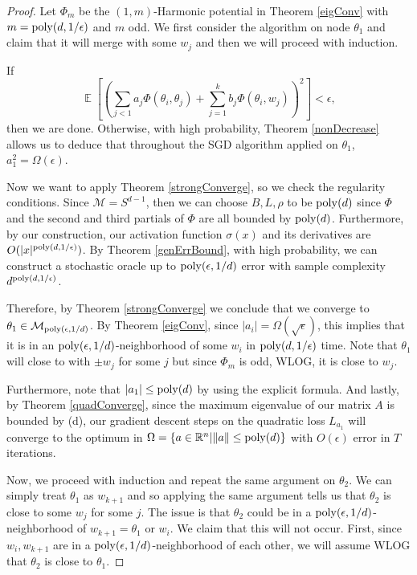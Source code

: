 \documentclass[11pt]{article}
\newcommand{\R}{{\mathbb{R}}}
\DeclareMathOperator*{\expt}{\mathbb{E}}
\begin{document}
\begin{proof}
Let $\Phi_m$ be the $(1,m)$-Harmonic potential in Theorem \ref{eigConv} with $m = \mathrm{poly}(d,1/\epsilon)$ and $m$ odd. We first consider the algorithm on node $\theta_1$ and claim that it will merge with some $w_j$ and then we will proceed with induction. 


If
%
\[ \expt\left[\left( \sum_{j < 1} a_j \Phi(\theta_i,\theta_j) +
    \sum_{j=1}^k b_j \Phi(\theta_i,w_j)\right)^2\right] < \epsilon,\]
then we are done. Otherwise, with high probability, Theorem
\ref{nonDecrease} allows us to deduce that throughout the SGD
algorithm applied on $\theta_1$, $a_1^2 = \Omega(\epsilon)$.

Now we want to apply Theorem \ref{strongConverge}, so we check the regularity conditions. Since $\mathcal{M} = S^{d-1}$, then we can choose $B, L, \rho$ to be $\mathrm{poly}(d)$ since $\Phi$ and the second and third partials of $\Phi$ are all bounded by $\mathrm{poly}(d)$. Furthermore, by our construction, our activation function $\sigma(x)$ and its derivatives are $O(|x|^{\mathrm{poly}(d,1/\epsilon)})$. By Theorem \ref{genErrBound}, with high probability, we can construct a stochastic oracle up to $\mathrm{poly}(\epsilon,1/d)$ error with sample complexity $d^{\mathrm{poly}(d,1/\epsilon)}$.


Therefore, by Theorem \ref{strongConverge} we conclude that we converge to $\theta_1 \in \mathcal{M}_{\mathrm{poly}(\epsilon,1/d)}$. By Theorem \ref{eigConv}, since $|a_i| = \Omega(\sqrt{\epsilon})$, this implies that it is in an $\mathrm{poly}(\epsilon,1/d)$-neighborhood of some $w_{i}$ in $\mathrm{poly}(d,1/\epsilon)$ time. Note that $\theta_1$ will close to with $\pm w_j$ for some $j$ but since $\Phi_m$ is odd, WLOG, it is close to $w_j$. 

Furthermore, note that $|a_1| \leq \mathrm{poly}(d)$ by using the explicit formula. And lastly, by Theorem \ref{quadConverge}, since the maximum eigenvalue of our matrix $A$ is bounded by \poly(d), our gradient descent steps on the quadratic loss $L_{a_1}$ will converge to the optimum in $\Omega = \{a \in \R^n | \|a\| \leq \poly(d)\}$ with $O(\epsilon)$ error in $T$ iterations.

Now, we proceed with induction and repeat the same argument on $\theta_2$. We can simply treat $\theta_1$ as $w_{k+1}$ and so applying the same argument tells us that $\theta_2$ is close to some $w_j$ for some $j$. The issue is that $\theta_2$ could be in a $\mathrm{poly}(\epsilon,1/d)$-neighborhood of $w_{k+1} = \theta_1$ or $w_i$. We claim that this will not occur. First, since $w_i, w_{k+1}$ are in a $\mathrm{poly}(\epsilon,1/d)$-neighborhood of each other, we will assume WLOG that $\theta_2$ is close to $\theta_1$.


\end{proof}
\end{document}
